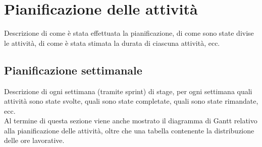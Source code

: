 \section{Pianificazione delle attività}
\label{sez:pianificazione-attivita}

Descrizione di come è stata effettuata la pianificazione, di come sono state divise le attività, di come è stata stimata la durata di ciascuna attività, ecc.\\

\subsection{Pianificazione settimanale}
\label{sez:pianificazione-settimanale}

Descrizione di ogni settimana (tramite sprint) di stage, per ogni settimana quali attività sono state svolte, quali sono state completate, quali sono state rimandate, ecc.\\
Al termine di questa sezione viene anche mostrato il diagramma di Gantt relativo alla pianificazione delle attività, oltre che una tabella contenente la distribuzione 
delle ore lavorative.\\

